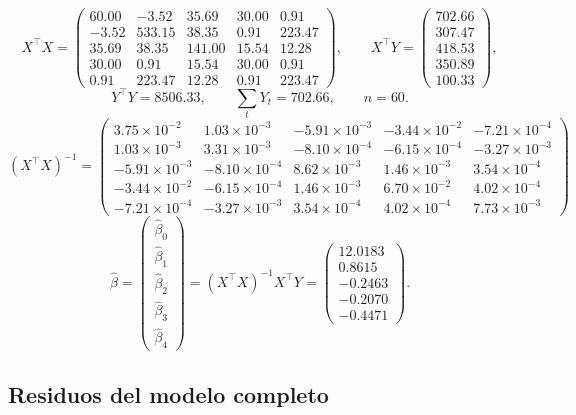 \[
X^\top X=\begin{pmatrix}60.00 & -3.52 & 35.69 & 30.00 & 0.91\\-3.52 & 533.15 & 38.35 & 0.91 & 223.47\\35.69 & 38.35 & 141.00 & 15.54 & 12.28\\30.00 & 0.91 & 15.54 & 30.00 & 0.91\\0.91 & 223.47 & 12.28 & 0.91 & 223.47\end{pmatrix},\qquad
X^\top Y=\begin{pmatrix}702.66\\307.47\\418.53\\350.89\\100.33\end{pmatrix},
\]
\[
\textstyle Y^\top Y=8506.33,\qquad \sum_t Y_t=702.66,\qquad n=60.
\]
{\small
\[
(X^\top X)^{-1}=\begin{pmatrix}3.75\times10^{-2} & 1.03\times10^{-3} & -5.91\times10^{-3} & -3.44\times10^{-2} & -7.21\times10^{-4}\\1.03\times10^{-3} & 3.31\times10^{-3} & -8.10\times10^{-4} & -6.15\times10^{-4} & -3.27\times10^{-3}\\-5.91\times10^{-3} & -8.10\times10^{-4} & 8.62\times10^{-3} & 1.46\times10^{-3} & 3.54\times10^{-4}\\-3.44\times10^{-2} & -6.15\times10^{-4} & 1.46\times10^{-3} & 6.70\times10^{-2} & 4.02\times10^{-4}\\-7.21\times10^{-4} & -3.27\times10^{-3} & 3.54\times10^{-4} & 4.02\times10^{-4} & 7.73\times10^{-3}\end{pmatrix}
\]}
\[
\hat\beta=\begin{pmatrix}\hat\beta_0\\\hat\beta_1\\\hat\beta_2\\\hat\beta_3\\\hat\beta_4\end{pmatrix}=(X^\top X)^{-1}X^\top Y=\begin{pmatrix}12.0183\\0.8615\\-0.2463\\-0.2070\\-0.4471\end{pmatrix}.
\]

\subsection*{Residuos del modelo completo}

